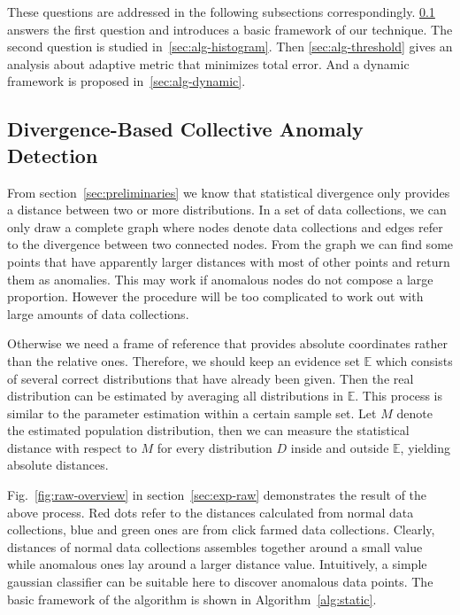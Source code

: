 \documentclass[10pt,conference,letterpaper]{IEEEtran}
\begin{document}
		These questions are addressed in the following subsections correspondingly.
		\ref{sec:alg-basic} answers the first question and introduces a basic framework of our technique. The second question is studied in~\ref{sec:alg-histogram}. Then \ref{sec:alg-threshold} gives an analysis about adaptive metric that minimizes total error. And a dynamic framework is proposed in~\ref{sec:alg-dynamic}.
	
		\subsection{Divergence-Based Collective Anomaly Detection}\label{sec:alg-basic}
			From section~\ref{sec:preliminaries} we know that statistical divergence only provides a distance between two or more distributions. In a set of data collections, we can only draw a complete graph where nodes denote data collections and edges refer to the divergence between two connected nodes. From the graph we can find some points that have apparently larger distances with most of other points and return them as anomalies. This may work if anomalous nodes do not compose a large proportion. However the procedure will be too complicated to work out with large amounts of data collections. 
	
			Otherwise we need a frame of reference that provides absolute coordinates rather than the relative ones. Therefore, we should keep an evidence set $\mathbb{E}$ which consists of several correct distributions that have already been given. Then the real distribution can be estimated by averaging all distributions in $\mathbb{E}$. This process is similar to the parameter estimation within a certain sample set. Let $M$ denote the estimated population distribution, then we can measure the statistical distance with respect to $M$ for every distribution $D$ inside and outside $\mathbb{E}$, yielding absolute distances. 
			
			Fig.~\ref{fig:raw-overview} in section~\ref{sec:exp-raw} demonstrates the result of the above process. Red dots refer to the distances calculated from normal data collections, blue and green ones are from click farmed data collections. Clearly, distances of normal data collections assembles together around a small value while anomalous ones lay around a larger distance value. Intuitively, a simple gaussian classifier can be suitable here to discover anomalous data points. The basic framework of the algorithm is shown in Algorithm~\ref{alg:static}.
	
\end{document}
